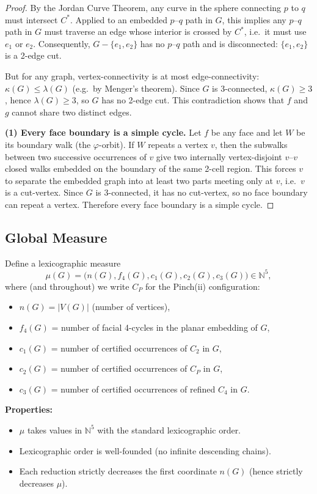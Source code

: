 \documentclass[12pt]{article}
\theoremstyle{definition}
\begin{document}
\begin{proof}
By the Jordan Curve Theorem, any curve in the sphere connecting $p$ to $q$ must intersect $C^*$.
Applied to an embedded $p$--$q$ path in $G$, this implies any $p$--$q$ path in $G$ must traverse
an edge whose interior is crossed by $C^*$, i.e.\ it must use $e_1$ or $e_2$.
Consequently, $G-\{e_1,e_2\}$ has no $p$--$q$ path and is disconnected: $\{e_1,e_2\}$ is a 2-edge cut.

But for any graph, vertex-connectivity is at most edge-connectivity:
$\kappa(G)\le \lambda(G)$ (e.g.\ by Menger's theorem).
Since $G$ is 3-connected, $\kappa(G)\ge 3$, hence $\lambda(G)\ge 3$, so $G$ has no 2-edge cut.
This contradiction shows that $f$ and $g$ cannot share two distinct edges.

\medskip
\noindent\textbf{(1) Every face boundary is a simple cycle.}
Let $f$ be any face and let $W$ be its boundary walk (the $\varphi$-orbit).
If $W$ repeats a vertex $v$, then the subwalks between two successive occurrences of $v$
give two internally vertex-disjoint $v$--$v$ closed walks embedded on the boundary of the same
2-cell region. This forces $v$ to separate the embedded graph into at least two parts meeting only at $v$,
i.e.\ $v$ is a cut-vertex. Since $G$ is 3-connected, it has no cut-vertex, so no face boundary can repeat a vertex.
Therefore every face boundary is a simple cycle.
\end{proof}

\subsection{Global Measure}
\label{sec:measure}

Define a lexicographic measure
\[
\mu(G) = \bigl(n(G), f_4(G), c_1(G), c_2(G), c_3(G)\bigr) \in \mathbb{N}^5,
\]
where (and throughout) we write $C_P$ for the Pinch(ii) configuration:
\begin{itemize}
    \item $n(G) = |V(G)|$ (number of vertices),
    \item $f_4(G)$ = number of facial 4-cycles in the planar embedding of $G$,
    \item $c_1(G)$ = number of certified occurrences of $C_2$ in $G$,
    \item $c_2(G)$ = number of certified occurrences of $C_P$ in $G$,
    \item $c_3(G)$ = number of certified occurrences of refined $C_4$ in $G$.
\end{itemize}

\textbf{Properties:}
\begin{itemize}
    \item $\mu$ takes values in $\mathbb{N}^5$ with the standard lexicographic order.
    \item Lexicographic order is well-founded (no infinite descending chains).
    \item Each reduction strictly decreases the first coordinate $n(G)$ (hence strictly decreases $\mu$).
\end{itemize}
\end{document}

